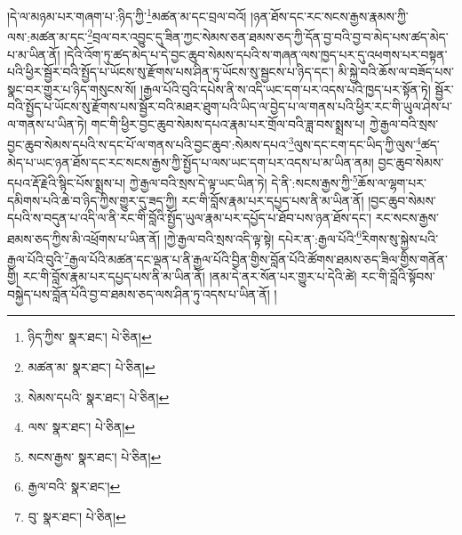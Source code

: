 །དེ་ལ་མཉམ་པར་གཞག་པ་:ཉིད་ཀྱི་\footnote{ཉིད་ཀྱིས་  སྣར་ཐང་།  པེ་ཅིན། }མཚན་མ་དང་བྲལ་བའོ། །ཉན་ཐོས་དང་རང་སངས་རྒྱས་རྣམས་ཀྱི་ལས་:མཚན་མ་དང་\footnote{མཚན་མ་  སྣར་ཐང་།  པེ་ཅིན། }བྲལ་བར་འབྱུང་དུ་ཟིན་ཀྱང་སེམས་ཅན་ཐམས་ཅད་ཀྱི་དོན་བྱ་བའི་བྱ་བ་མེད་པས་ཚད་མེད་པ་མ་ཡིན་ནོ། །དེའི་འོག་ཏུ་ཚད་མེད་པ་དེ་བྱང་ཆུབ་སེམས་དཔའི་ས་གཞན་ལས་ཁྱད་པར་དུ་འཕགས་པར་བསྟན་པའི་ཕྱིར་སྦྱོར་བའི་སྤྱོད་པ་ཡོངས་སུ་རྫོགས་པས་ཤིན་ཏུ་ཡོངས་སུ་སྦྱངས་པ་ཉིད་དང་། མི་སྐྱེ་བའི་ཆོས་ལ་བཟོད་པས་སྣང་བར་གྱུར་པ་ཉིད་གསུངས་སོ། །རྒྱལ་པོའི་བུའི་དཔེས་ནི་ས་འདི་ཡང་དག་པར་འདས་པའི་ཁྱད་པར་སྟོན་ཏེ། སྦྱོར་བའི་སྤྱོད་པ་ཡོངས་སུ་རྫོགས་པས་སྦྱོར་བའི་མཐར་ཐུག་པའི་ཡིད་ལ་བྱེད་པ་ལ་གནས་པའི་ཕྱིར་རང་གི་ཡུལ་ཤེས་པ་ལ་གནས་པ་ཡིན་ཏེ། གང་གི་ཕྱིར་བྱང་ཆུབ་སེམས་དཔའ་རྣམ་པར་གྲོལ་བའི་ཟླ་བས་སྨྲས་པ། ཀྱེ་རྒྱལ་བའི་སྲས་བྱང་ཆུབ་སེམས་དཔའི་ས་དང་པོ་ལ་གནས་པའི་བྱང་ཆུབ་:སེམས་དཔའ་\footnote{སེམས་དཔའི་  སྣར་ཐང་།  པེ་ཅིན། }ལུས་དང་ངག་དང་ཡིད་ཀྱི་ལུས་\footnote{ལས་  སྣར་ཐང་།  པེ་ཅིན། }ཚད་མེད་པ་ཡང་ཉན་ཐོས་དང་རང་སངས་རྒྱས་ཀྱི་སྤྱོད་པ་ལས་ཡང་དག་པར་འདས་པ་མ་ཡིན་ནམ། བྱང་ཆུབ་སེམས་དཔའ་རྡོ་རྗེའི་སྙིང་པོས་སྨྲས་པ། ཀྱེ་རྒྱལ་བའི་སྲས་དེ་ལྟ་ཡང་ཡིན་ཏེ། དེ་ནི་:སངས་རྒྱས་ཀྱི་\footnote{སངས་རྒྱས་  སྣར་ཐང་།  པེ་ཅིན། }ཆོས་ལ་ལྷག་པར་དམིགས་པའི་ཆེ་བ་ཉིད་ཀྱིས་གྱུར་དུ་ཟད་ཀྱི། རང་གི་བློས་རྣམ་པར་དཔྱད་པས་ནི་མ་ཡིན་ནོ། །བྱང་ཆུབ་སེམས་དཔའི་ས་བདུན་པ་འདི་ལ་ནི་རང་གི་བློའི་སྤྱོད་ཡུལ་རྣམ་པར་དཔྱོད་པ་ཐོབ་པས་ཉན་ཐོས་དང་། རང་སངས་རྒྱས་ཐམས་ཅད་ཀྱིས་མི་འཕྲོགས་པ་ཡིན་ནོ། །ཀྱེ་རྒྱལ་བའི་སྲས་འདི་ལྟ་སྟེ། དཔེར་ན་:རྒྱལ་པོའི་\footnote{རྒྱལ་བའི་  སྣར་ཐང་། }རིགས་སུ་སྐྱེས་པའི་རྒྱལ་པོའི་བུའི་\footnote{བུ་  སྣར་ཐང་།  པེ་ཅིན། }རྒྱལ་པོའི་མཚན་དང་ལྡན་པ་ནི་རྒྱལ་པོའི་བྱིན་གྱིས་བློན་པོའི་ཚོགས་ཐམས་ཅད་ཟིལ་གྱིས་གནོན་གྱི། རང་གི་བློས་རྣམ་པར་དཔྱད་པས་ནི་མ་ཡིན་ནོ། །ནམ་དེ་ནར་སོན་པར་གྱུར་པ་དེའི་ཚེ། རང་གི་བློའི་སྟོབས་བསྐྱེད་པས་བློན་པོའི་བྱ་བ་ཐམས་ཅད་ལས་ཤིན་ཏུ་འདས་པ་ཡིན་ནོ། །
